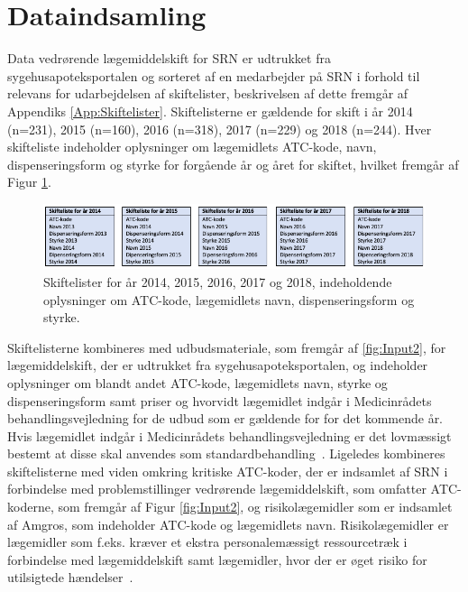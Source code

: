 
\section{Dataindsamling}
Data vedrørende lægemiddelskift for SRN er udtrukket fra sygehusapoteksportalen og sorteret af en medarbejder på SRN i forhold til relevans for udarbejdelsen af skiftelister, beskrivelsen af dette fremgår af Appendiks \ref{App:Skiftelister}. Skiftelisterne er gældende for skift i år 2014 (n=231), 2015 (n=160), 2016 (n=318), 2017 (n=229) og 2018 (n=244). Hver skifteliste indeholder oplysninger om lægemidlets ATC-kode, navn, dispenseringsform og styrke for forgående år og året for skiftet, hvilket fremgår af Figur \ref{fig:Input}.

\begin{figure}[H]\centering
\includegraphics[width=1\textwidth]{billeder/Input1.png} 
	\caption{Skiftelister for år 2014, 2015, 2016, 2017 og 2018, indeholdende oplysninger om ATC-kode, lægemidlets navn, dispenseringsform og styrke.}
	\label{fig:Input}  
\end{figure}

Skiftelisterne kombineres med udbudsmateriale, som fremgår af \ref{fig:Input2}, for lægemiddelskift, der er udtrukket fra sygehusapoteksportalen, og indeholder oplysninger om blandt andet ATC-kode, lægemidlets navn, styrke og dispenseringsform samt priser og hvorvidt lægemidlet indgår i Medicinrådets behandlingsvejledning for de udbud som er gældende for for det kommende år. Hvis lægemidlet indgår i Medicinrådets behandlingsvejledning er det lovmæssigt bestemt at disse skal anvendes som standardbehandling~\citep{Medicinradet2018}. Ligeledes kombineres skiftelisterne med viden omkring kritiske ATC-koder, der er indsamlet af SRN i forbindelse med problemstillinger vedrørende lægemiddelskift, som omfatter ATC-koderne, som fremgår af Figur \ref{fig:Input2}, og risikolægemidler som er indsamlet af Amgros, som indeholder ATC-kode og lægemidlets navn. Risikolægemidler er lægemidler som f.eks. kræver et ekstra personalemæssigt ressourcetræk i forbindelse med lægemiddelskift samt lægemidler, hvor der er øget risiko for utilsigtede hændelser~\citep{Amgros}. 

